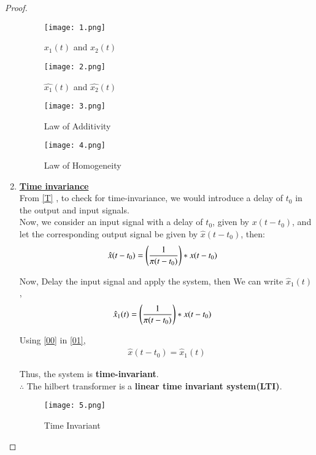 \documentclass[journal,12pt,twocolumn]{IEEEtran}
\begin{document}
\begin{proof}
\begin{enumerate}
 \begin{figure}[!htp]
\centering
 \texttt{[image: 1.png]}
 \caption{$x_1(t)$ and $x_2(t)$}
 \end{figure}
 
  \begin{figure}[!htp]
\centering
 \texttt{[image: 2.png]}
 \caption{$\hat{x_1}(t)$ and $\hat{x_2}(t)$}
 \label{fig2}
 \end{figure}
 
  \begin{figure}[!htp]
\centering
 \texttt{[image: 3.png]}
 \caption{Law of Additivity}
 \end{figure}
 
  \begin{figure}[!htp]
\centering
 \texttt{[image: 4.png]}
 \caption{Law of Homogeneity}
 \end{figure}


\item \textbf{\underline{Time invariance}}\\
From \eqref{T} , to check for time-invariance, we would introduce a delay of $t_0$ in the output and input signals.\\
Now, we consider an input signal with a delay of $t_0$, given by $x(t-t_0)$, and let the corresponding output signal be given by $\hat{x}(t-t_0)$, then:
\begin{align}
    \hat{x}(t-t_0) &=\left(\frac{1}{\pi (t-t_0)}\right)\ast x(t-t_0)\label{01}
\end{align}

Now, Delay the input signal and apply the system, then 
We can write $\hat{x}_1(t)$,
\begin{align}
\hat{x}_1(t)
    &= \left(\frac{1}{\pi (t-t_0)}\right)\ast x(t-t_0)\label{00}
\end{align}

Using \eqref{00} in \eqref{01},
\begin{align}
    \hat{x}(t-t_0) =\hat{x}_1(t) 
\end{align}

Thus, the system is \textbf{time-invariant}.\\
$\therefore$ The hilbert transformer is a \textbf{linear time invariant system(LTI)}.

 \begin{figure}[!htp]
\centering
 \texttt{[image: 5.png]}
 \caption{Time Invariant}
 \end{figure}


\end{enumerate}
\end{proof}
\end{document}
